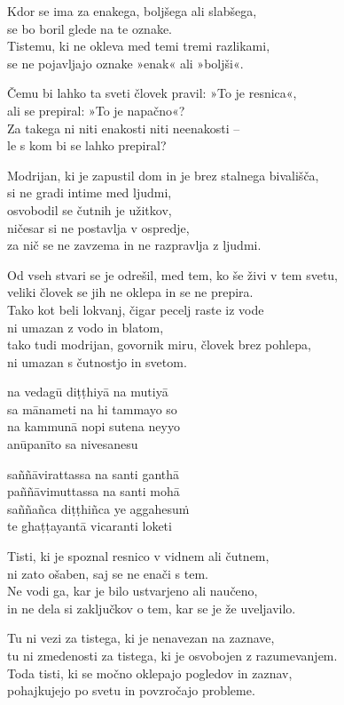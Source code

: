 \clearpage

Kdor se ima za enakega, boljšega ali slabšega,\\
se bo boril glede na te oznake.\\
Tistemu, ki ne okleva med temi tremi razlikami,\\
se ne pojavljajo oznake »enak« ali »boljši«.

Čemu bi lahko ta sveti človek pravil: »To je resnica«,\\
ali se prepiral: »To je napačno«?\\
Za takega ni niti enakosti niti neenakosti --\\
le s kom bi se lahko prepiral?

Modrijan, ki je zapustil dom in je brez stalnega bivališča,\\
si ne gradi intime med ljudmi,\\
osvobodil se čutnih je užitkov,\\\vin ničesar si ne postavlja v ospredje,\\
za nič se ne zavzema in ne razpravlja z ljudmi.

Od vseh stvari se je odrešil, med tem, ko še živi v tem svetu,\\
veliki človek se jih ne oklepa in se ne prepira.\\
Tako kot beli lokvanj, čigar pecelj raste iz vode\\
ni umazan z vodo in blatom,\\
tako tudi modrijan, govornik miru, človek brez pohlepa,\\
ni umazan s čutnostjo in svetom.


\clearpage

na vedagū diṭṭhiyā na mutiyā\\
sa mānameti na hi tammayo so\\
na kammunā nopi sutena neyyo\\
anūpanīto sa nivesanesu

saññāvirattassa na santi ganthā\\
paññāvimuttassa na santi mohā\\
saññañca diṭṭhiñca ye aggahesuṁ\\
te ghaṭṭayantā vicaranti loketi


\clearpage

Tisti, ki je spoznal resnico v vidnem ali čutnem,\\
ni zato ošaben, saj se ne enači s tem.\\
Ne vodi ga, kar je bilo ustvarjeno ali naučeno,\\
in ne dela si zaključkov o tem, kar se je že uveljavilo.

Tu ni vezi za tistega, ki je nenavezan na zaznave,\\
tu ni zmedenosti za tistega, ki je osvobojen z razumevanjem.\\
Toda tisti, ki se močno oklepajo pogledov in zaznav,\\
pohajkujejo po svetu in povzročajo probleme.

